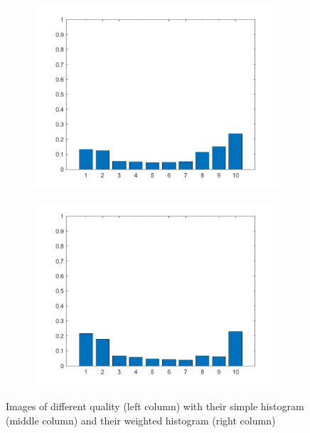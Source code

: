 \begin{figure}
\begin{subfigure}[b]{0.3\textwidth}
         \caption{}
         \label{}
     \end{subfigure}
     \hfill
     \begin{subfigure}[b]{0.3\textwidth}
         \centering
         \includegraphics[width=\textwidth]{./figs/simple_histogram4}
         \caption{}
         \label{}
     \end{subfigure}
     \hfill
     \begin{subfigure}[b]{0.3\textwidth}
         \centering
         \includegraphics[width=\textwidth]{./figs/wighted_histogram4}
         \caption{}
         \label{}
     \end{subfigure}
        \caption{Images of different quality (left column) with their simple histogram (middle column) and their weighted histogram (right column)}
        \label{fig:lbp_hist}
\end{figure}
